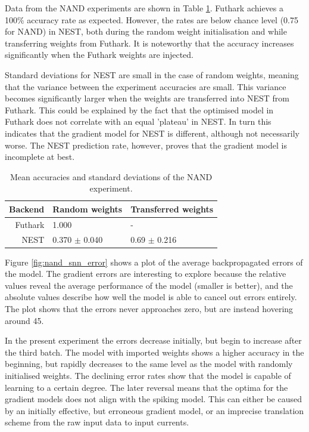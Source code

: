 \documentclass[report.tex]{subfiles}
\begin{document}
Data from the NAND experiments are shown in Table \ref{tab:nand}.
Futhark achieves a 100\% accuracy rate as expected.
However, the rates are below chance level (0.75 for NAND) in NEST, both during
the random weight initialisation and while transferring weights from Futhark.
It is noteworthy that the accuracy increases significantly when the Futhark weights are
injected.

Standard deviations for NEST are small in the case of random weights, meaning
that the variance between the experiment accuracies are small.
This variance becomes significantly larger when the weights are transferred into NEST from
Futhark.
This could be explained by the fact that the optimised model in Futhark does not
correlate with an equal 'plateau' in NEST. 
In turn this indicates that the gradient model for NEST is different, although
not necessarily worse.
The NEST prediction rate, however, proves that the gradient model is incomplete at
best.

\def\arraystretch{1.2}
\begin{table}
  \begin{tabular}{r|l l}
  Backend & Random weights & Transferred weights \\ \hline
  Futhark & 1.000 & - \\
  NEST & 0.370 $\pm$ 0.040 & 0.69 $\pm$ 0.216\\ 
  \end{tabular}
  \caption{Mean accuracies and standard deviations of the NAND experiment.}
  \label{tab:nand}
\end{table}

Figure \ref{fig:nand_snn_error} shows a plot of the average backpropagated errors of
the model.
The gradient errors are interesting to explore because the relative values reveal
the average performance of the model (smaller is better), and the absolute
values describe how well the model is able to cancel out errors entirely.
The plot shows that the errors never approaches zero, but are instead hovering
around 45.

In the present experiment the errors decrease initially, but begin to increase
after the third batch.
The model with imported weights shows a higher accuracy in the beginning, 
but rapidly decreases to the same level as the model with randomly initialised
weights.
The declining error rates show that the model is capable of learning to a
certain degree.
The later reversal means that the optima for the gradient models does not align
with the spiking model.
This can either be caused by an initially effective, but erroneous 
gradient model, or an imprecise translation scheme from the raw input data to
input currents.
\end{document}
